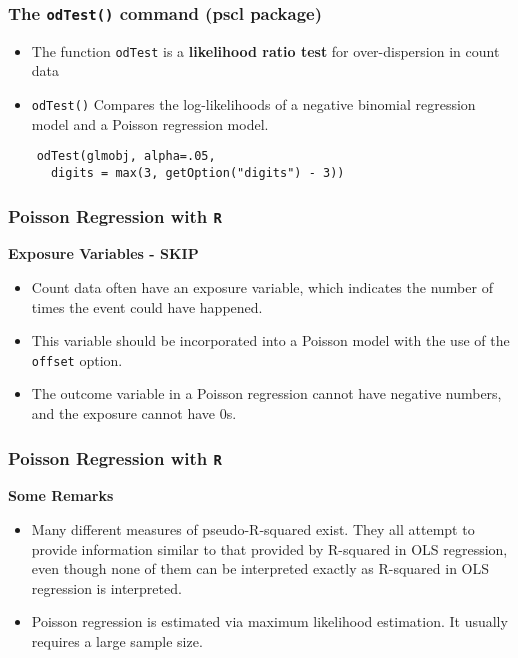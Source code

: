 \documentclass[MASTER.tex]{subfiles}
\begin{document}
\begin{frame}[fragile]
\frametitle{The \texttt{odTest()} command (pscl package)}
\begin{itemize}
\item	The function \texttt{odTest} is a \textbf{likelihood ratio test} for over-dispersion in count data
	
\item \texttt{odTest()}	Compares the log-likelihoods of a negative binomial regression model and a Poisson regression
	model.
\end{itemize}
	\begin{framed}
	\begin{verbatim}
	odTest(glmobj, alpha=.05, 
	  digits = max(3, getOption("digits") - 3))
\end{verbatim}
\end{framed}
\end{frame}
\begin{frame}[fragile]
	\frametitle{Poisson Regression with \texttt{R}}
	\Large
\textbf{Exposure Variables - SKIP }
	\begin{itemize} 
\item Count data often have an exposure variable, which indicates the number of times the event could have happened. 
\item This variable should be incorporated into a Poisson model with the use of the \texttt{offset} option.
\item The outcome variable in a Poisson regression cannot have negative numbers, and the exposure cannot have 0s.
\end{itemize}
\end{frame}
\begin{frame}[fragile]
\frametitle{Poisson Regression with \texttt{R}}
\Large
	
\textbf{Some Remarks}
	\begin{itemize} 

\item Many different measures of pseudo-R-squared exist. They all attempt to provide information similar to that provided by R-squared in OLS regression, even though none of them can be interpreted exactly as R-squared in OLS regression is interpreted.
 
\item Poisson regression is estimated via maximum likelihood estimation. It usually requires a large sample size. 
\end{itemize}
\end{frame}

\end{document}
